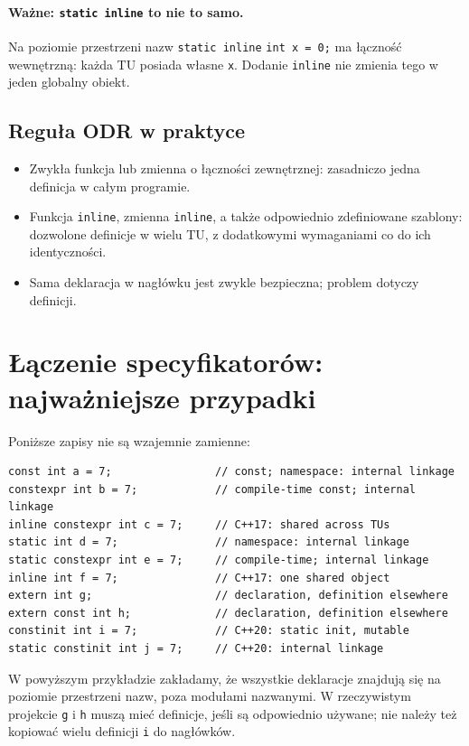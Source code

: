 \paragraph{Ważne: \texttt{static inline} to nie to samo.}
Na poziomie przestrzeni nazw \texttt{static inline} \texttt{int x = 0;}
ma łączność wewnętrzną: każda TU posiada własne \texttt{x}.
Dodanie \texttt{inline} nie zmienia tego w jeden globalny obiekt.

\subsection{Reguła ODR w praktyce}

\begin{itemize}
    \item Zwykła funkcja lub zmienna o łączności zewnętrznej:
    zasadniczo jedna definicja w całym programie.
    \item Funkcja \texttt{inline}, zmienna \texttt{inline}, a także
    odpowiednio zdefiniowane szablony: dozwolone definicje w wielu TU,
    z dodatkowymi wymaganiami co do ich identyczności.
    \item Sama deklaracja w nagłówku jest zwykle bezpieczna;
    problem dotyczy definicji.
\end{itemize}

\section{Łączenie specyfikatorów: najważniejsze przypadki}

Poniższe zapisy nie są wzajemnie zamienne:

\begin{lstlisting}
const int a = 7;                // const; namespace: internal linkage
constexpr int b = 7;            // compile-time const; internal linkage
inline constexpr int c = 7;     // C++17: shared across TUs
static int d = 7;               // namespace: internal linkage
static constexpr int e = 7;     // compile-time; internal linkage
inline int f = 7;               // C++17: one shared object
extern int g;                   // declaration, definition elsewhere
extern const int h;             // declaration, definition elsewhere
constinit int i = 7;            // C++20: static init, mutable
static constinit int j = 7;     // C++20: internal linkage
\end{lstlisting}

\noindent W powyższym przykładzie zakładamy, że wszystkie deklaracje
znajdują się na poziomie przestrzeni nazw, poza modułami nazwanymi.
W rzeczywistym projekcie \texttt{g} i \texttt{h} muszą mieć definicje,
jeśli są odpowiednio używane; nie należy też kopiować wielu definicji
\texttt{i} do nagłówków.

